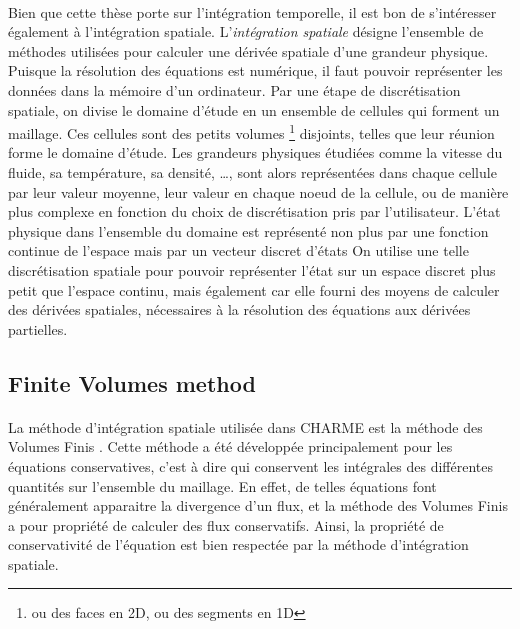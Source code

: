     \paragraph{}
    Bien que cette thèse porte sur l'intégration temporelle, il est bon de s'intéresser également à l'intégration spatiale.
    L'\emph{intégration spatiale} désigne l'ensemble de méthodes utilisées pour calculer une dérivée spatiale d'une grandeur physique.
    Puisque la résolution des équations est numérique, il faut pouvoir représenter les données dans la mémoire d'un ordinateur.
    Par une étape de discrétisation spatiale, on divise le domaine d'étude en un ensemble de cellules qui forment un maillage.
    Ces cellules sont des petits volumes \footnote{ou des faces en 2D, ou des segments en 1D} disjoints, telles que leur réunion forme le domaine d'étude.
    Les grandeurs physiques étudiées comme la vitesse du fluide, sa température, sa densité, \dots, sont alors représentées dans chaque cellule par leur valeur moyenne, leur valeur en chaque noeud de la cellule, ou de manière plus complexe en fonction du choix de discrétisation pris par l'utilisateur.
    L'état physique dans l'ensemble du domaine est représenté non plus par une fonction continue de l'espace mais par un vecteur discret d'états
    On utilise une telle discrétisation spatiale pour pouvoir représenter l'état sur un espace discret plus petit que l'espace continu, mais également car elle fourni des moyens de calculer des dérivées spatiales, nécessaires à la résolution des équations aux dérivées partielles.


    \subsection{Finite Volumes method}

      \paragraph{}
      La méthode d'intégration spatiale utilisée dans CHARME est la méthode des Volumes Finis \cite{EymardGallouetHerbin2000}.
      Cette méthode a été développée principalement pour les équations conservatives, c'est à dire qui conservent les intégrales des différentes quantités sur l'ensemble du maillage.
      En effet, de telles équations font généralement apparaitre la divergence d'un flux, et la méthode des Volumes Finis a pour propriété de calculer des flux conservatifs.
      Ainsi, la propriété de conservativité de l'équation est bien respectée par la méthode d'intégration spatiale.

